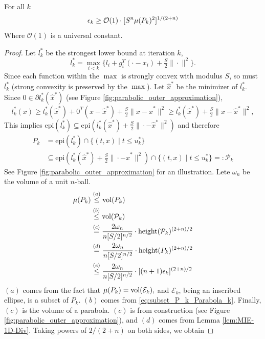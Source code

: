 \begin{lem}\label{lem:strongly_convex_lower_bound_k}
For all $k$
\[
\epsilon_k\geq\mathcal{O}(1)\cdot[S{}^{n}\mu(P_k)^2]^{1/(2+n)}
\]
Where $\mathcal{O}(1)$ is a universal constant.
\end{lem}
\begin{proof}
Let $l^*_k$ be the strongest lower bound at iteration $k$,
\[
l^*_k = \max_{i < k}\{l_i + g_i^T(\cdot-x_i) + \tfrac{S}{2}\|\cdot \|^2\}.
\]
Since each function within the $\max$ is strongly convex with modulus $S$,
so must $l^*_k$ (strong convexity is preserved by the $\max$). Let $\hat{x}^*$ be the minimizer of $l^*_k$. Since $0\in\partial l^*_k(\hat{x}^*)$ (see Figure \ref{fig:parabolic_outer_approximation}),
\[
l^*_k(x)\geq l^*_k(\hat{x}^*)+0^{T}(x-\hat{x}^*)+\tfrac{S}{2}\|x-\hat{x}^*\|^2\geq l^*_k(\hat{x}^*)+\tfrac{S}{2}\|x-\hat{x}^*\|^2,
\]
This implies $\mbox{epi}(l^*_k) \subseteq\mbox{epi}(l^*_k(\hat{x}^*)+\tfrac{S}{2}\|\cdot-\hat{x}^*\|^2)$ and therefore
\begin{align}\label{eq:subset_P_k_Parabola_k}
P_k & =\mbox{epi}(l^*_k) \cap \{(t,x) \mid t \leq u^*_k \} \\
    & \subseteq\mbox{epi}(l^*_k(\hat{x}^*)+\tfrac{S}{2}\|\cdot-\hat{x}^*\|^2)\cap \{(t,x) \mid t \leq u^*_k \}  =:\mathcal{P}_k
\end{align}
See Figure \ref{fig:parabolic_outer_approximation} for an illustration. Lete $\omega_n$ be the volume of a unit $n$-ball.
\begin{align*}
\mu(P_k) & \overset{(a)}{\leq}\textnormal{vol}(P_k)\\
 & \overset{(b)}{\leq}\textnormal{vol}(\mathcal{P}_k) \\
 & \overset{(c)}{=}\frac{2\omega_n}{n[S/2]^{n/2}}\cdot \mbox{height}(\mathcal{P}_k)^{(2+n)/2} \\
 & \overset{(d)}{=}\frac{2\omega_n}{n[S/2]^{n/2}}\cdot \mbox{height}(P_k)^{(2+n)/2} \\
 & \overset{(e)}{\leq}\frac{2\omega_n }{n[S/2]^{n/2}} \cdot [(n+1)\epsilon_k]^{(2+n)/2}
\end{align*}
$(a)$ comes from the fact that $\mu(P_k)=\textnormal{vol}(\mathcal{E}_k),$
and $\mathcal{E}_k$, being an inscribed ellipse, is a subset of
$P_k$. $(b)$ comes from \eqref{eq:subset_P_k_Parabola_k}. Finally, $(c)$ is the volume
of a parabola. $(c)$ is from construction (see Figure \ref{fig:parabolic_outer_approximation}), and $(d)$ comes from Lemma \ref{lem:MIE-1D-Div}. Taking powers of
$2/(2+n)$ on both sides, we obtain

\end{proof}
